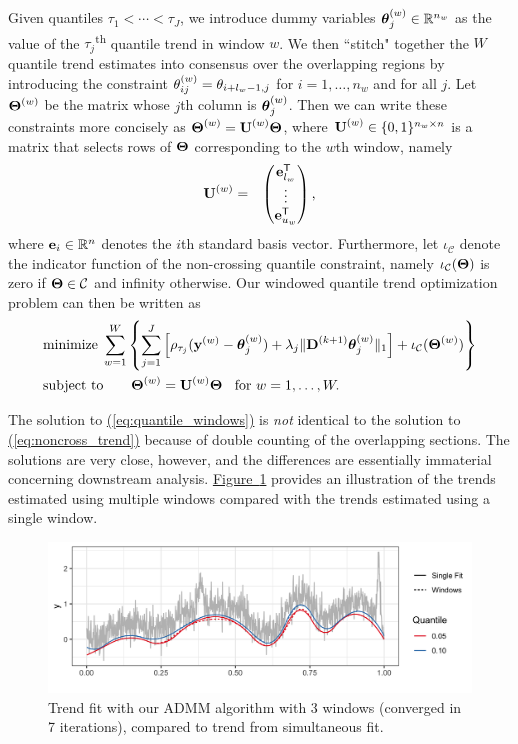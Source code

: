 \documentclass[aoas]{imsart}
\newcommand{\Eqn}[1]{\hyperref[eq:#1]{{\rm (\ref*{eq:#1})}}} %
\newcommand{\Fig}[1]{\hyperref[fig:#1]{Figure~\ref*{fig:#1}}} %
\newcommand{\Eqn}[1]{{(\ref{eq:#1})}} %
\newcommand{\Fig}[1]{{Figure~\ref{fig:#1}}} %
\newcommand{\Real}{\mathbb{R}}
\newcommand{\Tra}{^{\sf T}} %
\newcommand{\V}[1]{{\bm{\mathbf{\MakeLowercase{#1}}}}} %
\newcommand{\VE}[2]{\MakeLowercase{#1}_{#2}} %
\newcommand{\Vn}[2]{\V{#1}^{(#2)}} %
\newcommand{\VnE}[3]{{#1}^{(#2)}_{#3}} %
\newcommand{\M}[1]{{\bm{\mathbf{\MakeUppercase{#1}}}}} %
\newcommand{\Mn}[2]{\M{#1}^{(#2)}} %
\begin{document}
 Given quantiles $\tau_1 < \cdots < \tau_J$, we introduce dummy variables $\Vn{\theta}{w}_{j} \in \Real^{n_w}$ as the value of the $\tau_j$\textsuperscript{th} quantile trend in window $w$. We then ``stitch" together the $W$ quantile trend estimates into consensus over the overlapping regions by introducing the constraint $\VnE{\theta}{w}{ij} = \VE{\theta}{i + l_w - 1,j}$ for $i = 1, \ldots, n_w$ and for all $j$. Let $\Mn{\Theta}{w}$ be the matrix whose $j$th column is $\Vn{\theta}{w}_{j}$. Then we can write these constraints more concisely as $\Mn{\Theta}{w} = \Mn{U}{w}\M{\Theta}$, where $\Mn{U}{w} \in \{0, 1\}^{n_w \times n}$ is a matrix that selects rows of $\M{\Theta}$ corresponding to the $w$th window, namely
 \begin{eqnarray*}
 	\Mn{U}{w} & = & \begin{pmatrix}
 		\V{e}_{l_w}\Tra \\
 		\vdots \\
 		\V{e}_{u_w}\Tra
 	\end{pmatrix},
 \end{eqnarray*}
 where $\V{e}_i \in \Real^{n}$ denotes the $i$th standard basis vector. Furthermore, let $\iota_{\mathcal{C}}$ denote the indicator function of the non-crossing quantile constraint, namely $\iota_{\mathcal{C}}(\M{\Theta})$ is zero if $\M{\Theta} \in \mathcal{C}$ and infinity otherwise. Our windowed quantile trend optimization problem can then be written as
 \begin{equation}
 \label{eq:quantile_windows}
 \begin{split}
 &\text{minimize}\; \sum_{w=1}^W \left \{\sum_{j=1}^J \left [\rho_{\tau_j}(\Vn{y}{w} - \Vn{\theta}{w}_{j}) +
 \lambda_j \lVert \Mn{D}{k+1} \Vn{\theta}{w}_{j} \rVert_1 \right ] + \iota_\mathcal{C}(\Mn{\Theta}{w}) \right\}\\
 &\text{subject to} \qquad \Mn{\Theta}{w} = \Mn{U}{w}\M{\Theta} \;\; \text{ for } w = 1, \ldots, W.
 \end{split}
 \end{equation}
  
 The solution to \Eqn{quantile_windows} is {\em not} identical to the solution to \Eqn{noncross_trend} because of double counting of the overlapping sections. The solutions are very close, however, and the differences are essentially immaterial concerning downstream analysis. \Fig{windowsfit} provides an illustration of the trends estimated using multiple windows compared with the trends estimated using a single window. 
 
 
 \begin{figure}
 	\centering
 	\includegraphics[width = 0.8\linewidth]{Figures/admm_windows.png}
 	\caption{Trend fit with our ADMM algorithm with 3 windows (converged in 7 iterations), compared to trend from simultaneous fit.} 
 	\label{fig:windowsfit}
 \end{figure}
 
\end{document}
